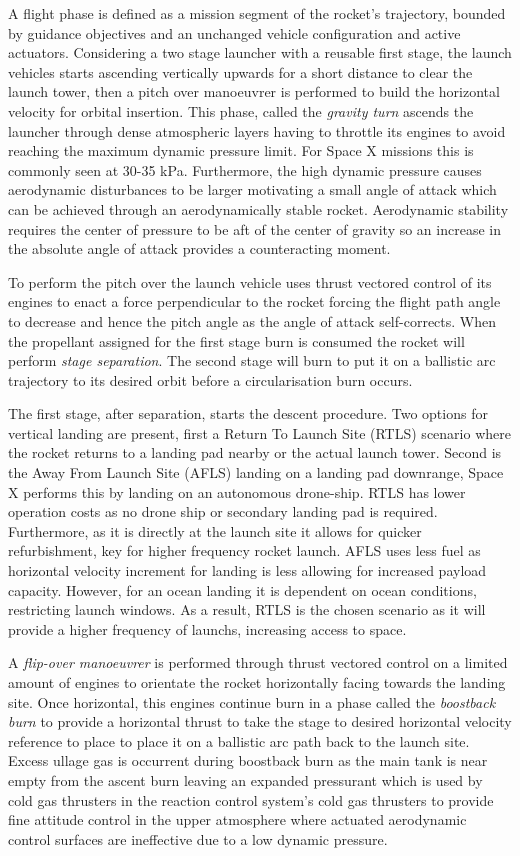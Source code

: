 A flight phase is defined as a mission segment of the rocket's trajectory, bounded by guidance objectives and an unchanged vehicle configuration and active actuators. Considering a two stage launcher with a reusable first stage, the launch vehicles starts ascending vertically upwards for a short distance to clear the launch tower, then a pitch over manoeuvrer is performed to build the horizontal velocity for orbital insertion. This phase, called the \textit{gravity turn} ascends the launcher through dense atmospheric layers having to throttle its engines to avoid reaching the maximum dynamic pressure limit. For Space X missions this is commonly seen at 30-35 kPa. Furthermore, the high dynamic pressure causes aerodynamic disturbances to be larger motivating a small angle of attack which can be achieved through an aerodynamically stable rocket. Aerodynamic stability requires the center of pressure to be aft of the center of gravity so an increase in the absolute angle of attack provides a counteracting moment.


To perform the pitch over the launch vehicle uses thrust vectored control of its engines to enact a force perpendicular to the rocket forcing the flight path angle to decrease and hence the pitch angle as the angle of attack self-corrects. When the propellant assigned for the first stage burn is consumed the rocket will perform \textit{stage separation}. The second stage will burn to put it on a ballistic arc trajectory to its desired orbit before a circularisation burn occurs.

The first stage, after separation, starts the descent procedure. Two options for vertical landing are present, first a Return To Launch Site (RTLS) scenario where the rocket returns to a landing pad nearby or the actual launch tower. Second is the Away From Launch Site (AFLS) landing on a landing pad downrange, Space X performs this by landing on an autonomous drone-ship. RTLS has lower operation costs as no drone ship or secondary landing pad is required. Furthermore, as it is directly at the launch site it allows for quicker refurbishment, key for higher frequency rocket launch. AFLS uses less fuel as horizontal velocity increment for landing is less allowing for increased payload capacity. However, for an ocean landing it is dependent on ocean conditions, restricting launch windows. As a result, RTLS is the chosen scenario as it will provide a higher frequency of launchs, increasing access to space.

A \textit{flip-over manoeuvrer} is performed through thrust vectored control on a limited amount of engines to orientate the rocket horizontally facing towards the landing site. Once horizontal, this engines continue burn in a phase called the \textit{boostback burn} to provide a horizontal thrust to take the stage to desired horizontal velocity reference to place to place it on a ballistic arc path back to the launch site. Excess ullage gas is occurrent during boostback burn as the main tank is near empty from the ascent burn leaving an expanded pressurant which is used by cold gas thrusters in the reaction control system's cold gas thrusters to provide fine attitude control in the upper atmosphere where actuated aerodynamic control surfaces are ineffective due to a low dynamic pressure.

